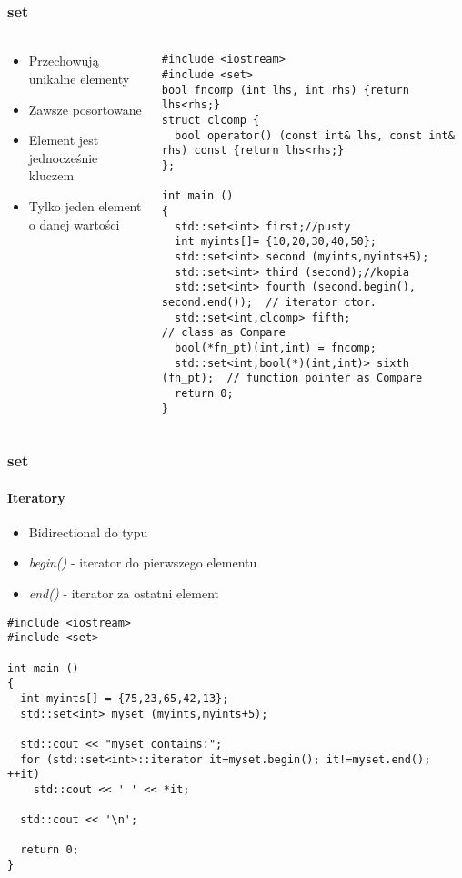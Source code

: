 \documentclass[10pt]{beamer}
\begin{document}
\begin{frame}[fragile]
  \frametitle{set}
  \framesubtitle{}
  \begin{columns}
    \begin{column}{0.4\textwidth}
    \begin{itemize}
      \item Przechowują unikalne elementy
      \item Zawsze posortowane
      \item Element jest jednocześnie kluczem
      \item Tylko jeden element o danej wartości
    \end{itemize}
    \end{column}
    \begin{column}{0.7\textwidth}
\begin{lstlisting}
#include <iostream>
#include <set>
bool fncomp (int lhs, int rhs) {return lhs<rhs;}
struct clcomp {
  bool operator() (const int& lhs, const int& rhs) const {return lhs<rhs;}
};

int main ()
{
  std::set<int> first;//pusty
  int myints[]= {10,20,30,40,50};
  std::set<int> second (myints,myints+5);
  std::set<int> third (second);//kopia
  std::set<int> fourth (second.begin(), second.end());  // iterator ctor.
  std::set<int,clcomp> fifth;                 // class as Compare
  bool(*fn_pt)(int,int) = fncomp;
  std::set<int,bool(*)(int,int)> sixth (fn_pt);  // function pointer as Compare
  return 0;
}
\end{lstlisting}
    \end{column}
  \end{columns}
\end{frame}

\begin{frame}[fragile]
  \frametitle{set}
  \framesubtitle{Iteratory}
  \begin{itemize}
    \item Bidirectional do typu
    \item \textit{begin()} - iterator do pierwszego elementu
    \item \textit{end()} - iterator za ostatni element
  \end{itemize}
  \begin{lstlisting}
#include <iostream>
#include <set>

int main ()
{
  int myints[] = {75,23,65,42,13};
  std::set<int> myset (myints,myints+5);

  std::cout << "myset contains:";
  for (std::set<int>::iterator it=myset.begin(); it!=myset.end(); ++it)
    std::cout << ' ' << *it;

  std::cout << '\n';

  return 0;
}
\end{lstlisting}
\end{frame}
\end{document}
